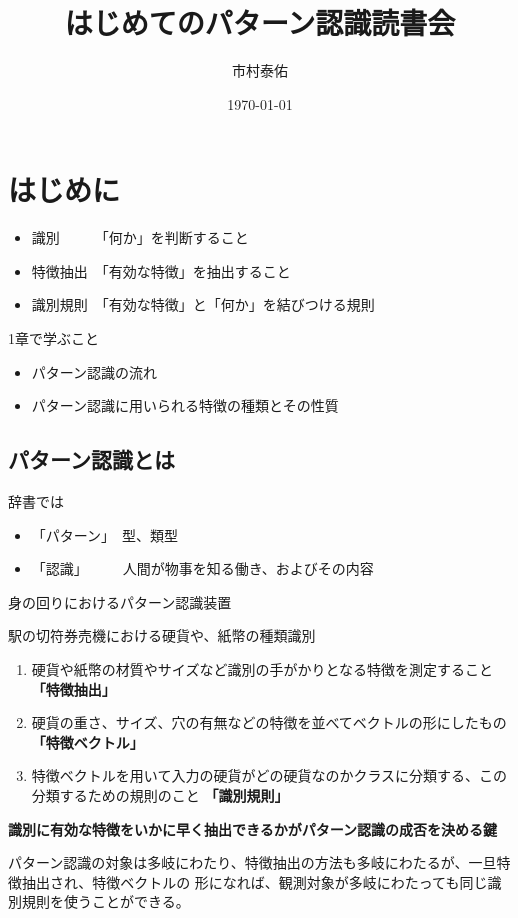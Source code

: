 \documentclass[11pt]{article}
\author{市村泰佑}
\date{\today}
\title{はじめてのパターン認識読書会}
\begin{document}
\maketitle
\tableofcontents


\section{はじめに}
\label{sec:orgheadline16}
\begin{itemize}
\item 識別　　　「何か」を判断すること
\item 特徴抽出　「有効な特徴」を抽出すること
\item 識別規則　「有効な特徴」と「何か」を結びつける規則
\end{itemize}


1章で学ぶこと
\begin{itemize}
\item パターン認識の流れ
\item パターン認識に用いられる特徴の種類とその性質
\end{itemize}

\subsection{パターン認識とは}
\label{sec:orgheadline1}
辞書では
\begin{itemize}
\item 「パターン」　型、類型
\item 「認識」　　　人間が物事を知る働き、およびその内容
\end{itemize}

身の回りにおけるパターン認識装置

駅の切符券売機における硬貨や、紙幣の種類識別

\begin{enumerate}
\item 硬貨や紙幣の材質やサイズなど識別の手がかりとなる特徴を測定すること \textbf{「特徴抽出」}
\item 硬貨の重さ、サイズ、穴の有無などの特徴を並べてベクトルの形にしたもの \textbf{「特徴ベクトル」}
\item 特徴ベクトルを用いて入力の硬貨がどの硬貨なのかクラスに分類する、この分類するための規則のこと \textbf{「識別規則」}
\end{enumerate}

\textbf{\textbf{識別に有効な特徴をいかに早く抽出できるかがパターン認識の成否を決める鍵}}

パターン認識の対象は多岐にわたり、特徴抽出の方法も多岐にわたるが、一旦特徴抽出され、特徴ベクトルの
形になれば、観測対象が多岐にわたっても同じ識別規則を使うことができる。
\end{document}
